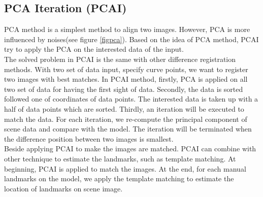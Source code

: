 \subsection{PCA Iteration (PCAI)}
PCA method is a simplest method to align two images. However, PCA is more influenced by noises(see figure \ref{figpca}). Based on the idea of PCA method, PCAI try to apply the PCA on the interested data of the input.\\[0.2cm]
The solved problem in PCAI is the same with other difference registration methods. With two set of data input, specify curve points, we want to register two images with best matches. In PCAI method, firstly, PCA is applied on all two set of data for having the first sight of data. Secondly, the data is sorted followed one of coordinates of data points. The interested data is taken up with a half of data points which are sorted. Thirdly, an iteration will be executed to match the data. For each iteration, we re-compute the principal component of scene data and compare with the model. The iteration will be terminated when the difference position between two images is smallest.\\[0.1cm]
Beside applying PCAI to make the images are matched. PCAI can combine with other technique to estimate the landmarks, such as template matching. At beginning, PCAI is applied to match the images. At the end, for each manual landmarks on the model, we apply the template matching to estimate the location of landmarks on scene image. 
